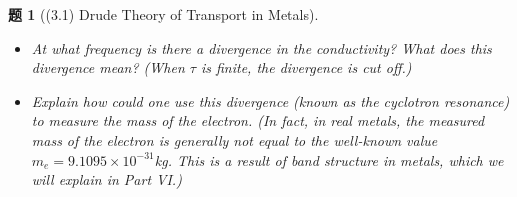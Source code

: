 \documentclass[UTF8,10pt,a4paper]{article}
\theoremstyle{Problem}
\newtheorem{prob}{题}
\theoremstyle{Solution}
\begin{document}
\begin{prob}[(3.1) Drude Theory of Transport in Metals]
\begin{enumerate}
        \begin{itemize}
            \item[$\triangleright$] At what frequency is there a divergence in the conductivity? What does this divergence mean? (When $\tau$ is finite, the divergence is cut off.)
            \item[$\triangleright$] Explain how could one use this divergence (known as the cyclotron resonance) to measure the mass of the electron. (In fact, in real metals, the measured mass of the electron is generally not equal to the well-known value $m_e=9.1095\times 10^{-31}$kg. This is a result of band structure in metals, which we will explain in Part VI.)
        \end{itemize}
    \end{enumerate}
\end{prob}
\end{document}
